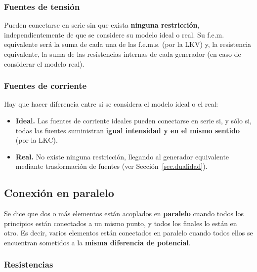         \subsubsection{Fuentes de tensión}
		
        Pueden conectarse en serie sin que exista \textbf{ninguna
          restricción}, independientemente de que se considere su
        modelo ideal o real. Su f.e.m. equivalente será la suma de
        cada una de las f.e.m.s. (por la LKV) y, la resistencia
        equivalente, la suma de las resistencias internas de cada
        generador (en caso de considerar el modelo real).
		
        \subsubsection{Fuentes de corriente}
		
        Hay que hacer diferencia entre si se considera el modelo ideal
        o el real:
        \begin{itemize}
        \item \textbf{Ideal.} Las fuentes de corriente ideales pueden
          conectarse en serie si, y sólo si, todas las fuentes
          suministran \textbf{igual intensidad y en el mismo sentido}
          (por la LKC).
        \item \textbf{Real.} No existe ninguna restricción, llegando
          al generador equivalente mediante trasformación de fuentes
          (ver Sección~\ref{sec.dualidad}).
        \end{itemize}
	
	\subsection{Conexión en paralelo}
	Se dice que dos o más elementos están acoplados en
        \textbf{paralelo} cuando todos los principios están conectados
        a un mismo punto, y todos los finales lo están en otro. Es
        decir, varios elementos están conectados en paralelo cuando
        todos ellos se encuentran sometidos a la \textbf{misma
          diferencia de potencial}.
	
        \subsubsection{Resistencias}
			
